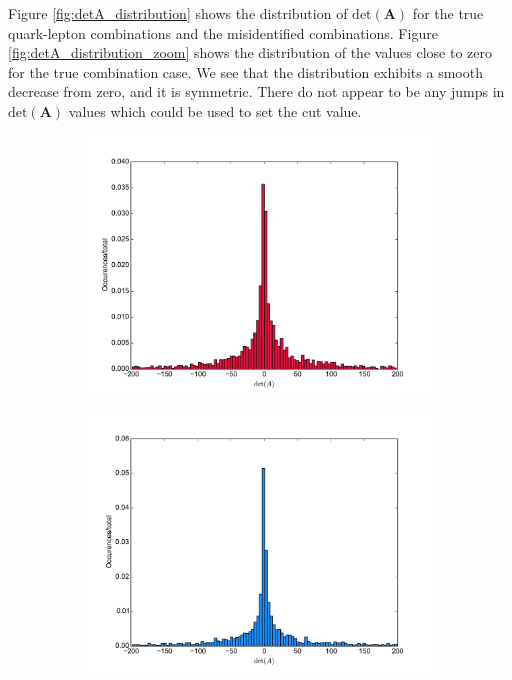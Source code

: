 \documentclass[twoside,english]{uiofysmaster}
\begin{document}
Figure \ref{fig:detA_distribution} shows the distribution of $\mathrm{det}(\mathbf{A})$ for the true quark-lepton combinations and the misidentified combinations. Figure \ref{fig:detA_distribution_zoom} shows the distribution of the values close to zero for the true combination case. We see that the distribution exhibits a smooth decrease from zero, and it is symmetric. There do not appear to be any jumps in $\mathrm{det}(\mathbf{A})$ values which could be used to set the cut value.
\begin{figure}[hbt]
	\centering
	\begin{subfigure}[b]{0.45\textwidth}
		\includegraphics[width=\textwidth]{figures/improving_combinatorics/histogram_detA_truecombo_herwigpp-nosmear.pdf} 
		\caption{ }
		\label{fig:detA_distribution_a}
	\end{subfigure}
	\begin{subfigure}[b]{0.45\textwidth}
		\includegraphics[width=\textwidth]{figures/improving_combinatorics/histogram_detA_wrongcombo_herwigpp-nosmear.pdf}
		\caption{ } 
		\label{fig:detA_distribution_b}
	\end{subfigure}


\end{figure}
\end{document}
